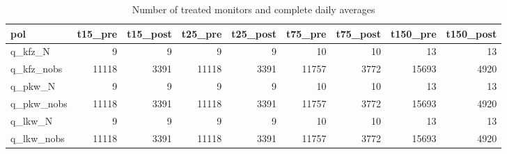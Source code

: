 \begin{table}[!htb]
\centering
\begingroup\footnotesize
\begin{tabular}{lrrrrrrrr}
  \toprule
pol & t15\_pre & t15\_post & t25\_pre & t25\_post & t75\_pre & t75\_post & t150\_pre & t150\_post \\ 
  \midrule
q\_kfz\_N & 9 & 9 & 9 & 9 & 10 & 10 & 13 & 13 \\ 
  q\_kfz\_nobs & 11118 & 3391 & 11118 & 3391 & 11757 & 3772 & 15693 & 4920 \\ 
  q\_pkw\_N & 9 & 9 & 9 & 9 & 10 & 10 & 13 & 13 \\ 
  q\_pkw\_nobs & 11118 & 3391 & 11118 & 3391 & 11757 & 3772 & 15693 & 4920 \\ 
  q\_lkw\_N & 9 & 9 & 9 & 9 & 10 & 10 & 13 & 13 \\ 
  q\_lkw\_nobs & 11118 & 3391 & 11118 & 3391 & 11757 & 3772 & 15693 & 4920 \\ 
   \bottomrule
\end{tabular}
\endgroup
\caption{Number of treated monitors and complete daily averages} 
\end{table}
